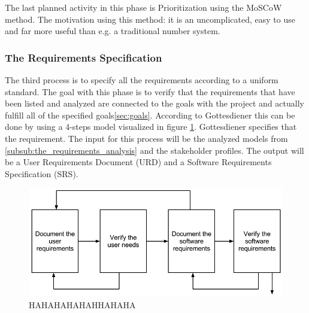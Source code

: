\documentclass[a4paper]{article}
\begin{document}
The last planned activity in this phase is Prioritization using the MoSCoW method. The motivation using this method: it is an uncomplicated, easy to use and far more useful than e.g. a traditional number system\cite{coleyconsulting}.

\subsubsection{The Requirements Specification}
\label{subsub:the_requirements_specification}

The third process is to specify all the requirements according to a uniform standard. The goal with this phase is to verify that the requirements that have been listed and analyzed are connected to the goals with the project and actually fulfill all of the specified goals\ref{sec:goals}. According to Gottesdiener\cite{gott232} this can be done by using a 4-steps model visualized in figure \ref{figure:specifications}. Gottesdiener specifies that the requirement. The input for this process will be the analyzed models from \ref{subsub:the_requirements_analysis} and the stakeholder profiles. The output will be a User Requirements Document (URD) and a Software Requirements Specification (SRS).

\begin{figure}[!ht]
	\centering
		\includegraphics[width=1\textwidth]{images/specifications_model.png}
	\caption{HAHAHAHAHAHHAHAHA}
	\label{figure:specifications}
\end{figure}
\end{document}
